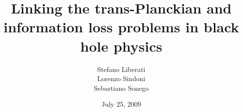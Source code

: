 \documentclass[12pt]{article}
\begin{document}
\title{\Large Linking the trans-Planckian and information loss problems in black hole physics}
\author{\large Stefano Liberati \\ Lorenzo Sindoni \\ Sebastiano Sonego}
\date{July 25, 2009}
\bigskip\sloppy
\def\e{{\mathrm e}}%
\def\g{{\mbox{\sl g}}}%
\def\Box{\nabla^2}%
\def\d{{\mathrm d}}%
\def\ie{{\em i.e.\/}}%
\def\eg{{\em e.g.\/}}%
\def\etc{{\em etc.\/}}%
\def\etal{{\em et al.\/}}%
\newcommand{\scri}{\mathscr{I}}
\renewcommand{\thefigure}{\arabic{figure}}
\def\HRULE{{\bigskip\hrule\bigskip}}%
\def\implies{{\Rightarrow}}
\maketitle
\end{document}
